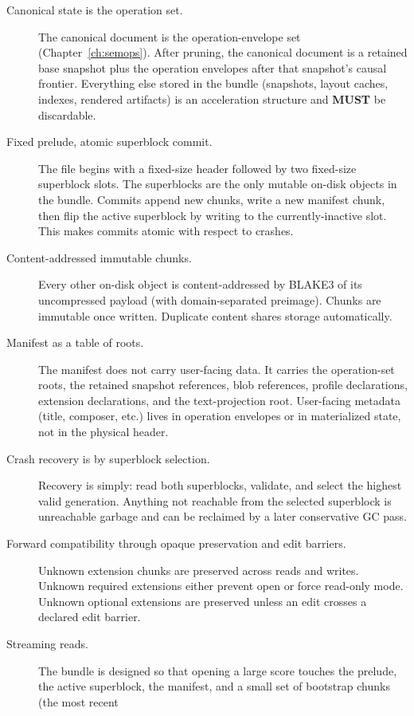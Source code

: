 \documentclass[11pt,letterpaper]{report}
\newcommand{\MUST}{\textbf{MUST}}
\begin{document}
\begin{description}
  \item[Canonical state is the operation set.] The canonical
    document is the operation-envelope set
    (Chapter~\ref{ch:semops}). After pruning, the canonical document
    is a retained base snapshot plus the operation envelopes after
    that snapshot's causal frontier. Everything else stored in the
    bundle (snapshots, layout caches, indexes, rendered artifacts)
    is an acceleration structure and \MUST{} be discardable.
  \item[Fixed prelude, atomic superblock commit.] The file begins
    with a fixed-size header followed by two fixed-size superblock
    slots. The superblocks are the only mutable on-disk objects in
    the bundle. Commits append new chunks, write a new manifest
    chunk, then flip the active superblock by writing to the
    currently-inactive slot. This makes commits atomic with respect
    to crashes.
  \item[Content-addressed immutable chunks.] Every other on-disk
    object is content-addressed by BLAKE3 of its uncompressed
    payload (with domain-separated preimage). Chunks are immutable
    once written. Duplicate content shares storage automatically.
  \item[Manifest as a table of roots.] The manifest does not carry
    user-facing data. It carries the operation-set roots, the
    retained snapshot references, blob references, profile
    declarations, extension declarations, and the text-projection
    root. User-facing metadata (title, composer, etc.) lives in
    operation envelopes or in materialized state, not in the
    physical header.
  \item[Crash recovery is by superblock selection.] Recovery is
    simply: read both superblocks, validate, and select the highest
    valid generation. Anything not reachable from the selected
    superblock is unreachable garbage and can be reclaimed by a
    later conservative GC pass.
  \item[Forward compatibility through opaque preservation and edit
    barriers.] Unknown extension chunks are preserved across reads
    and writes. Unknown required extensions either prevent open or
    force read-only mode. Unknown optional extensions are preserved
    unless an edit crosses a declared edit barrier.
  \item[Streaming reads.] The bundle is designed so that opening a
    large score touches the prelude, the active superblock, the
    manifest, and a small set of bootstrap chunks (the most recent

\end{description}
\end{document}
